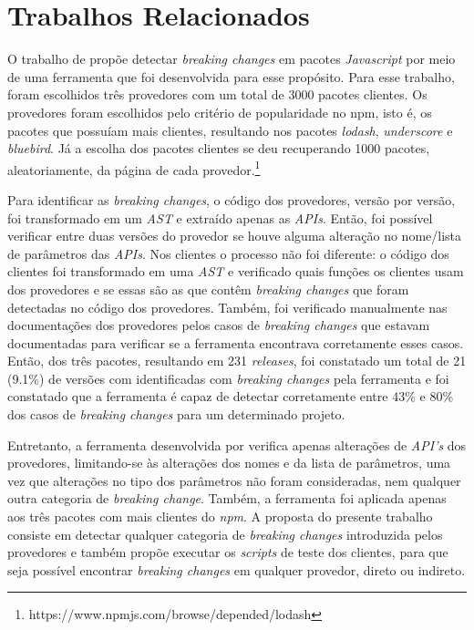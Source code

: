 \section{Trabalhos Relacionados}
\label{sec:related_works}

O trabalho de  propõe detectar \textit{breaking changes} em pacotes \textit{Javascript} por meio de uma ferramenta que foi desenvolvida para esse propósito. Para esse trabalho, foram escolhidos três provedores com um total de 3000 pacotes clientes. Os provedores foram escolhidos pelo critério de popularidade no \gls{npm}, isto é, os pacotes que possuíam mais clientes, resultando nos pacotes \textit{lodash}, \textit{underscore} e \textit{bluebird}. Já a escolha dos pacotes clientes se deu recuperando 1000 pacotes, aleatoriamente, da página de cada provedor.\footnote{https://www.npmjs.com/browse/depended/lodash}

Para identificar as \textit{breaking changes}, o código dos provedores, versão por versão, foi transformado em um \textit{AST} e extraído apenas as \textit{APIs}. Então, foi possível verificar entre duas versões do provedor se houve alguma alteração no nome/lista de parâmetros das \textit{APIs}. Nos clientes o processo não foi diferente: o código dos clientes foi transformado em uma \textit{AST} e verificado quais funções os clientes usam dos provedores e se essas são as que contêm \textit{breaking changes} que foram detectadas no código dos provedores. Também, foi verificado manualmente nas documentações dos provedores pelos casos de \textit{breaking changes} que estavam documentadas para verificar se a ferramenta encontrava corretamente esses casos. Então, dos três pacotes, resultando em 231 \textit{releases}, foi constatado um total de 21 (9.1\%) de versões com identificadas com \textit{breaking changes} pela ferramenta e foi constatado que a ferramenta é capaz de detectar corretamente entre 43\% e 80\% dos casos de \textit{breaking changes} para um determinado projeto.

Entretanto, a ferramenta desenvolvida por  verifica apenas alterações de \textit{API's} dos provedores, limitando-se às alterações dos nomes e da lista de parâmetros, uma vez que alterações no tipo dos parâmetros não foram consideradas, nem qualquer outra categoria de \textit{breaking change}. Também, a ferramenta foi aplicada apenas aos três pacotes com mais clientes do \textit{npm}. A proposta do presente trabalho consiste em detectar qualquer categoria de \textit{breaking changes} introduzida pelos provedores e também propõe executar os \textit{scripts} de teste dos clientes, para que seja possível encontrar \textit{breaking changes} em qualquer provedor, direto ou indireto.

